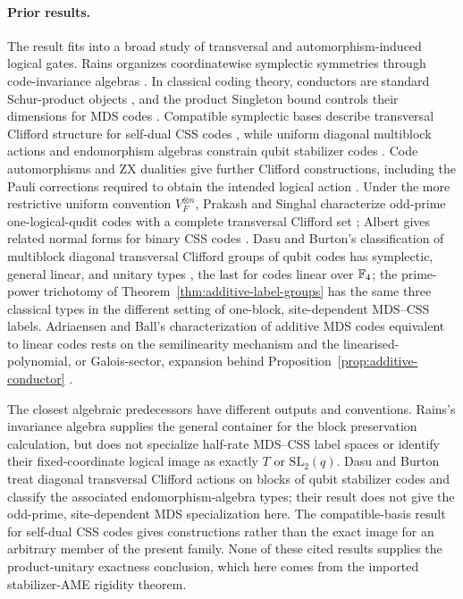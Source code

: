 \paragraph{Prior results.}
The result fits into a broad study of transversal and automorphism-induced
logical gates.  Rains organizes coordinatewise symplectic symmetries through
code-invariance algebras \cite[Theorems~4 and~14]{RainsNonbinary1999}.
In classical coding theory, conductors are standard Schur-product objects
\cite[Section~2]{CouvreurMarquezCorbellaPellikaan2017}, and the product
Singleton bound controls their dimensions for MDS codes
\cite{MirandolaZemor2015}.
Compatible symplectic bases describe transversal Clifford structure for
self-dual CSS codes \cite[Theorem~1]{TansuwannontTakadaFujii2025}, while
uniform diagonal multiblock actions and endomorphism algebras constrain qubit
stabilizer codes \cite[Section~II and Theorem~6.1]{DasuBurton2025}.
Code automorphisms and ZX dualities give further Clifford constructions,
including the Pauli corrections required to obtain the intended logical
action \cite[Sections~III--IV]{SayginelEtAl2025}.  Under the more restrictive
uniform convention \(V_F^{\otimes n}\), Prakash and Singhal characterize
odd-prime one-logical-qudit codes with a complete transversal Clifford set
\cite[Section~IV.C]{PrakashSinghal2026}; Albert gives related normal forms for
binary CSS codes \cite[Sections~III--V]{Albert2026}.
Dasu and Burton's classification of multiblock diagonal transversal Clifford
groups of qubit codes has symplectic, general linear, and unitary types
\cite[Theorem~6.1]{DasuBurton2025}, the last for codes linear over
\(\mathbb F_4\); the prime-power trichotomy of
Theorem~\ref{thm:additive-label-groups} has the same three classical types
in the different setting of one-block, site-dependent MDS--CSS labels.
Adriaensen and Ball's characterization of additive MDS codes equivalent to
linear codes rests on the semilinearity mechanism and the
linearised-polynomial, or Galois-sector, expansion behind
Proposition~\ref{prop:additive-conductor}
\cite[Lemmas~5.2 and~5.6]{AdriaensenBall2023}.

The closest algebraic predecessors have different outputs and conventions.
Rains's invariance algebra supplies the general container for the block
preservation calculation, but does not specialize half-rate MDS--CSS label
spaces or identify their fixed-coordinate logical image as exactly \(T\) or
\(\mathrm{SL}_2(q)\).  Dasu and Burton treat diagonal transversal Clifford
actions on blocks of qubit stabilizer codes and classify the associated
endomorphism-algebra types; their result does not give the odd-prime,
site-dependent MDS specialization here.  The compatible-basis result for
self-dual CSS codes gives constructions rather than the exact image for an
arbitrary member of the present family.  None of these cited results supplies
the product-unitary exactness conclusion, which here comes from the imported
stabilizer-AME rigidity theorem.

